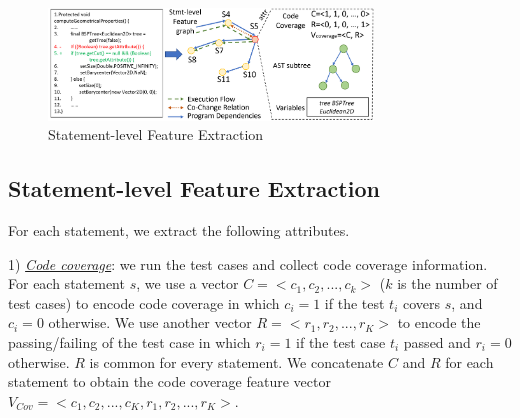 

\begin{figure}[t]
	\centering
	\includegraphics[width=3.4in]{graphs/step-1-statement.png}
	\caption{Statement-level Feature Extraction}
	\label{statement-level-feature-extraction}
\end{figure}

\subsection{Statement-level Feature Extraction}

For each statement, we extract the following attributes.

1) {\em \underline{Code coverage}}: we run the test cases and collect code
coverage information. For each statement $s$, we use a vector $C =
<c_1, c_2, ..., c_k>$ ($k$ is the number of test cases) to encode code
coverage in which $c_i=1$ if the test $t_i$ covers $s$, and $c_i=0$
otherwise. We use another vector $R = <r_1, r_2, ..., r_K>$ to encode
the passing/failing of the test case in which $r_i=1$ if the test case
$t_i$ passed and $r_i=0$ otherwise. $R$ is common for every statement.
We concatenate $C$ and $R$ for each statement to obtain the code
coverage feature vector $V_{Cov} = <c_1, c_2, ..., c_K, r_1, r_2, ...,
r_K>$.

